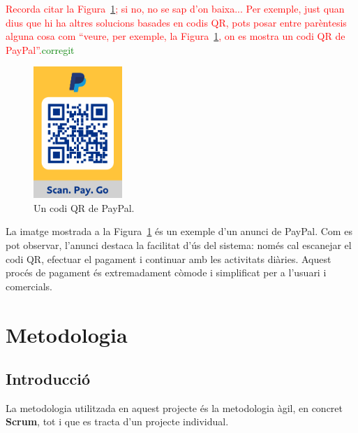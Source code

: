 \documentclass[a4paper,12pt,twoside]{ThesisStyle}
\newcommand{\pau}[1]{\textcolor{red}{#1}}
\newcommand{\sudan}[1]{\textcolor{green}{#1}}
\begin{document}
\pau{Recorda citar la Figura~\ref{fig:Un codi QR de Paypal}; si no, no se sap d'on baixa... Per exemple, just quan dius que hi ha altres solucions basades en codis QR, pots posar entre parèntesis alguna cosa com ``veure, per exemple, la Figura~\ref{fig:Un codi QR de Paypal}, on es mostra un codi QR de PayPal''.}\sudan{corregit}

\begin{figure}[h!] %
    \centering
    \includegraphics[width=0.3\textwidth]{imatges/paypal.png} %
    \caption{Un codi QR de PayPal.} %
    \label{fig:Un codi QR de Paypal} %
  \end{figure}

  La imatge mostrada a la Figura~\ref{fig:Un codi QR de Paypal} és un exemple d'un anunci de PayPal. Com es pot observar, l'anunci destaca la facilitat d'ús del sistema: només cal escanejar el codi QR, efectuar el pagament i continuar amb les activitats diàries. Aquest procés de pagament és extremadament còmode i simplificat per a l'usuari i comercials.

\chapter{Metodologia}
\label{chp:metodologia}


\section{Introducció}
\label{subsec: Introducció}

La metodologia utilitzada en aquest projecte és la metodologia àgil, en concret \textbf{Scrum}, tot i que es tracta d'un projecte individual.\\
\end{document}
